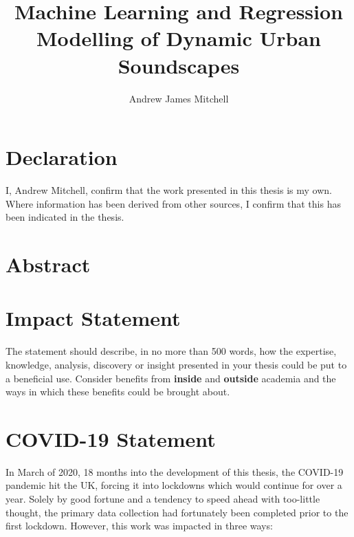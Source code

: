 \documentclass[twoside,fontsize=12pt,titlepage]{scrbook}
\title{Machine Learning and Regression Modelling of Dynamic Urban Soundscapes}
\author{Andrew James Mitchell}
\begin{document}
\begin{titlepage}
    \AddToShipoutPicture*{}
    \maketitle
\end{titlepage}


\restoregeometry


\chapter*{Declaration}
I, Andrew Mitchell, confirm that the work presented in this thesis is my own. Where information has been derived from other sources, I confirm that this has been indicated in the thesis.

\chapter*{Abstract}


\chapter*{Impact Statement}
The statement should describe, in no more than 500 words, how the expertise, knowledge, analysis, discovery or insight presented in your thesis could be put to a beneficial use. Consider benefits from \textbf{inside} and \textbf{outside} academia and the ways in which these benefits could be brought about.

\chapter*{COVID-19 Statement}

In March of 2020, 18 months into the development of this thesis, the COVID-19 pandemic hit the UK, forcing it into lockdowns which would continue for over a year. Solely by good fortune and a tendency to speed ahead with too-little thought, the primary data collection had fortunately been completed prior to the first lockdown. However, this work was impacted in three ways: 
\end{document}

